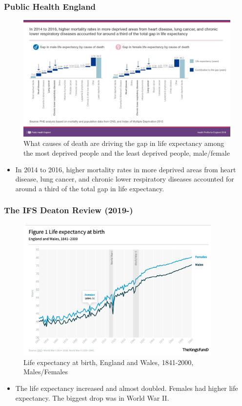 \subsubsection{Public Health England}
\begin{figure}[H]%
                \centering
                \includegraphics[width=5in]{images/ch3/30.png}
                \caption{What causes of death are driving the gap in life expectancy among the most deprived people and the least deprived people, male/female}
                \label{fig:label}
            \end{figure}
\begin{itemize}
        \item In 2014 to 2016, higher mortality rates in more deprived areas from heart disease, lung cancer, and chronic lower respiratory diseases accounted for around a third of the total gap in life expectancy.
\end{itemize}

\subsubsection{The IFS Deaton Review (2019-)}

\begin{figure}[H]%
                \centering
                \includegraphics[width=4in]{images/ch3/31.png}
                \caption{Life expectancy at birth, England and Wales, 1841-2000, Males/Females}
                \label{fig:label}
            \end{figure}
\begin{itemize}
        \item The life expectancy increased and almost doubled. Females had higher life expectancy. The biggest drop was in World War II.
\end{itemize}
 
